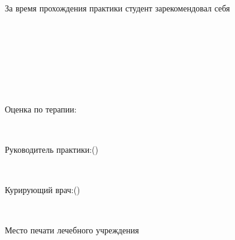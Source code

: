 \documentclass[a4paper,12pt]{extarticle}
\begin{document}
~\hrulefill 

~\hrulefill 

~\hrulefill 

~\hrulefill 

~\hrulefill 

~\hrulefill

~\hrulefill

~\hrulefill

~\hrulefill

~

За время прохождения практики студент зарекомендовал себя \hrulefill 

~\hrulefill 

~\hrulefill 

~\hrulefill 

~

Оценка по терапии: \hrulefill

~

Руководитель практики:\hrulefill (\hrulefill)

~

Курирующий врач:\hrulefill (\hrulefill)

~

Место печати лечебного учреждения
\end{document}
